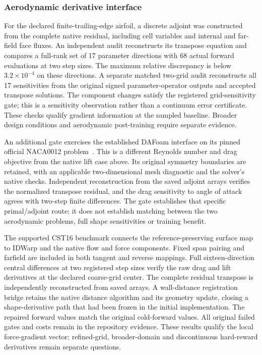 \subsubsection{Aerodynamic derivative interface}
For the declared finite-trailing-edge airfoil, a discrete adjoint was constructed from the complete native residual, including cell variables and internal and far-field face fluxes. An independent audit reconstructs its transpose equation and compares a full-rank set of 17 parameter directions with 68 actual forward evaluations at two step sizes. The maximum relative discrepancy is below $3.2\times10^{-4}$ on these directions. A separate matched two-grid audit reconstructs all 17 sensitivities from the original signed parameter-operator outputs and accepted transpose solutions. The component changes satisfy the registered grid-sensitivity gate; this is a sensitivity observation rather than a continuum error certificate. These checks qualify gradient information at the sampled baseline. Broader design conditions and aerodynamic post-training require separate evidence.

An additional gate exercises the established DAFoam interface on its pinned official NACA0012 problem~\cite{he2020dafoam}. This is a different Reynolds number and drag objective from the native lift case above. Its original symmetry boundaries are retained, with an applicable two-dimensional mesh diagnostic and the solver's native checks. Independent reconstruction from the saved adjoint arrays verifies the normalized transpose residual, and the drag sensitivity to angle of attack agrees with two-step finite differences. The gate establishes that specific primal/adjoint route; it does not establish matching between the two aerodynamic problems, full shape sensitivities or training benefit.

The supported CST16 benchmark connects the reference-preserving surface map to IDWarp and the native flow and force components. Fixed span pairing and farfield are included in both tangent and reverse mappings. Full sixteen-direction central differences at two registered step sizes verify the raw drag and lift derivatives at the declared coarse-grid center. The complete residual transpose is independently reconstructed from saved arrays. A wall-distance registration bridge retains the native distance algorithm and its geometry update, closing a shape-derivative path that had been frozen in the initial implementation. The repaired forward values match the original cold-forward values. All original failed gates and costs remain in the repository evidence. These results qualify the local force-gradient vector; refined-grid, broader-domain and discontinuous hard-reward derivatives remain separate questions.

